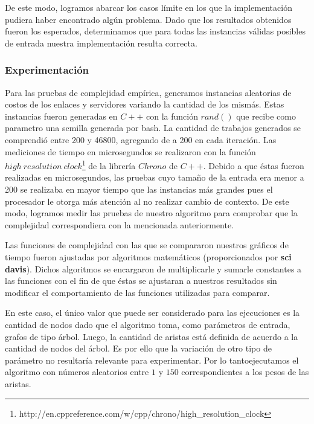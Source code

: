 De este modo, logramos abarcar los casos límite en los que la implementación pudiera haber encontrado algún problema. Dado que los resultados obtenidos fueron los esperados, determinamos que para todas las instancias válidas posibles de entrada nuestra implementación resulta correcta.

\subsubsection{Experimentación}

Para las pruebas de complejidad empírica, generamos instancias aleatorias de costos de los enlaces y servidores variando la cantidad de los mismás. Estas instancias fueron generadas en $C++$ con la función $rand()$ que recibe como parametro una semilla generada por bash. La cantidad de trabajos generados se comprendió entre 200 y 46800, agregando de a 200 en cada iteración. Las mediciones de tiempo en microsegundos se realizaron con la función $high\ resolution\ clock$\footnote{http://en.cppreference.com/w/cpp/chrono/high\_resolution\_clock} de la librería $Chrono$ de $C++$. Debido a que éstas fueron realizadas en microsegundos, las pruebas cuyo tamaño de la entrada era menor a 200 se realizaba en mayor tiempo que las instancias más grandes pues el procesador le otorga más atención al no realizar cambio de contexto. De este modo, logramos medir las pruebas de nuestro algoritmo para comprobar que la complejidad correspondiera con la mencionada anteriormente.

Las funciones de complejidad con las que se compararon nuestros gráficos de tiempo fueron ajustadas por algoritmos matemáticos (proporcionados por \textbf{sci davis}). Dichos algoritmos se encargaron de multiplicarle y sumarle constantes a las funciones con el fin de que éstas se ajustaran a nuestros resultados sin modificar el comportamiento de las funciones utilizadas para comparar.

En este caso, el único valor que puede ser considerado para las ejecuciones es la cantidad de nodos dado que el algoritmo toma, como parámetros de entrada, grafos de tipo árbol. Luego, la cantidad de aristas está definida de acuerdo a la cantidad de nodos del árbol. Es por ello que la variación de otro tipo de parámetro no resultaría relevante para experimentar. Por lo tantoejecutamos el algoritmo con números aleatorios entre $1$ y $150$ correspondientes a los pesos de las aristas.

